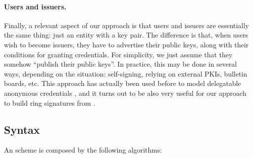 \paragraph{Users and issuers.} %
Finally, a relevant aspect of our approach is that users and issuers are
essentially the same thing: just an entity with a key pair. The difference is
that, when users wish to become issuers, they have to advertise their public
keys, along with their conditions for granting credentials. For simplicity, we
just assume that they somehow ``publish their public keys''. In practice, this
may be done in several ways, depending on the situation: self-signing, relying
on external PKIs, bulletin boards, etc.
%
This approach has actually been used before to model delegatable anonymous
credentials \cite{bcc+09}, and it turns out to be also very useful for our
approach to build ring signatures from \UAS.

\subsection{Syntax}
\label{ssec:syntax-uas}

An \UAS scheme is composed by the following algorithms:

